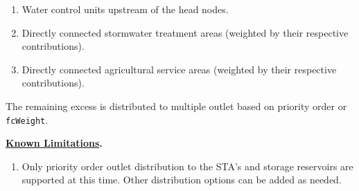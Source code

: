 \begin{enumerate}
   \begin{enumerate} 

     \item Water control units upstream of the head nodes.

     \item Directly connected stormwater treatment areas (weighted by
       their respective contributions).

     \item Directly connected agricultural service areas (weighted by
       their respective contributions).

   \end{enumerate}

   The remaining excess is distributed to multiple outlet based on
   priority order or {\tt fcWeight}.

\end{enumerate}

\textbf{\underline{Known Limitations}.} 

\begin{enumerate}
  \item Only priority order outlet distribution to the STA's and
  storage reservoirs are supported at this time.  Other distribution
  options can be added as needed.
\end{enumerate}
